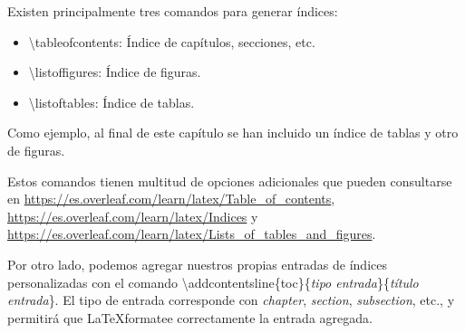Existen principalmente tres comandos para generar índices:

\begin{itemize}
	\item \textbackslash tableofcontents: Índice de capítulos, secciones, etc.
	\item \textbackslash listoffigures: Índice de figuras.
	\item \textbackslash listoftables: Índice de tablas.
\end{itemize}

Como ejemplo, al final de este capítulo se han incluido un índice de tablas y otro de figuras.

Estos comandos tienen multitud de opciones adicionales que pueden consultarse en \url{https://es.overleaf.com/learn/latex/Table_of_contents}, \url{https://es.overleaf.com/learn/latex/Indices} y \url{https://es.overleaf.com/learn/latex/Lists_of_tables_and_figures}.

Por otro lado, podemos agregar nuestros propias entradas de índices personalizadas con el comando \textbackslash addcontentsline\{toc\}\{\emph{tipo entrada}\}\{\emph{título entrada}\}. El tipo de entrada corresponde con \emph{chapter}, \emph{section}, \emph{subsection}, etc., y permitirá que \LaTeX formatee correctamente la entrada agregada.

\listoffigures
\listoftables

